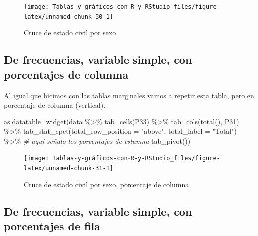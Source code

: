 \documentclass[
]{book}
\newenvironment{Shaded}{\begin{snugshade}}{\end{snugshade}}
\newcommand{\AttributeTok}[1]{\textcolor[rgb]{0.77,0.63,0.00}{#1}}
\newcommand{\CommentTok}[1]{\textcolor[rgb]{0.56,0.35,0.01}{\textit{#1}}}
\newcommand{\FunctionTok}[1]{\textcolor[rgb]{0.00,0.00,0.00}{#1}}
\newcommand{\NormalTok}[1]{#1}
\newcommand{\SpecialCharTok}[1]{\textcolor[rgb]{0.00,0.00,0.00}{#1}}
\newcommand{\StringTok}[1]{\textcolor[rgb]{0.31,0.60,0.02}{#1}}
\begin{document}
\begin{figure}[H]

{\centering \texttt{[image: Tablas-y-gráficos-con-R-y-RStudio\_files/figure-latex/unnamed-chunk-30-1]} 

}

\caption{Cruce de estado civil por sexo}\label{fig:unnamed-chunk-30}
\end{figure}

\hypertarget{de-frecuencias-variable-simple-con-porcentajes-de-columna}{%
\subsection{De frecuencias, variable simple, con porcentajes de columna}\label{de-frecuencias-variable-simple-con-porcentajes-de-columna}}

Al igual que hicimos con las tablas marginales vamos a repetir esta tabla, pero en porcentaje de columna (vertical).

\begin{Shaded}
\begin{Highlighting}[]
\FunctionTok{as.datatable\_widget}\NormalTok{(data }\SpecialCharTok{\%\textgreater{}\%}
    \FunctionTok{tab\_cells}\NormalTok{(P33) }\SpecialCharTok{\%\textgreater{}\%}
    \FunctionTok{tab\_cols}\NormalTok{(}\FunctionTok{total}\NormalTok{(), P31) }\SpecialCharTok{\%\textgreater{}\%}
    \FunctionTok{tab\_stat\_cpct}\NormalTok{(}\AttributeTok{total\_row\_position =} \StringTok{"above"}\NormalTok{, }\AttributeTok{total\_label =} \StringTok{"Total"}\NormalTok{) }\SpecialCharTok{\%\textgreater{}\%} \CommentTok{\# aquí señalo los porcentajes de columna}
    \FunctionTok{tab\_pivot}\NormalTok{())}
\end{Highlighting}
\end{Shaded}

\begin{figure}[H]

{\centering \texttt{[image: Tablas-y-gráficos-con-R-y-RStudio\_files/figure-latex/unnamed-chunk-31-1]} 

}

\caption{Cruce de estado civil por sexo, porcentaje de columna}\label{fig:unnamed-chunk-31}
\end{figure}

\hypertarget{de-frecuencias-variable-simple-con-porcentajes-de-fila}{%
\subsection{De frecuencias, variable simple, con porcentajes de fila}\label{de-frecuencias-variable-simple-con-porcentajes-de-fila}}
\end{document}
